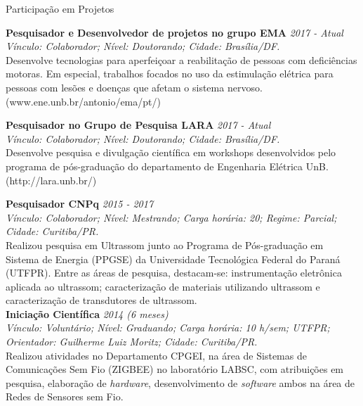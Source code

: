 \documentclass{resume} %
\begin{document}
\begin{rSection}{Participação em Projetos} 

{\bf Pesquisador e Desenvolvedor de projetos no grupo EMA} \hfill {\em 2017 - Atual}
\\\textit{Vínculo: Colaborador; Nível: Doutorando; Cidade: Brasília/DF.}
\\Desenvolve tecnologias para aperfeiçoar a reabilitação de pessoas com deficiências motoras. Em especial, trabalhos focados no uso da estimulação elétrica para pessoas com lesões e doenças que afetam o sistema nervoso.(www.ene.unb.br/antonio/ema/pt/)

{\bf Pesquisador no Grupo de Pesquisa LARA} \hfill {\em 2017 - Atual}
\\\textit{Vínculo: Colaborador; Nível: Doutorando; Cidade: Brasília/DF.}
\\Desenvolve pesquisa e divulgação científica em workshops desenvolvidos pelo programa de pós-graduação do departamento de Engenharia Elétrica UnB. (http://lara.unb.br/)

{\bf Pesquisador CNPq} \hfill {\em 2015 - 2017}
\\\textit{Vínculo: Colaborador; Nível: Mestrando; Carga horária: 20; Regime: Parcial; Cidade: Curitiba/PR.}
\\Realizou pesquisa em Ultrassom junto ao Programa de Pós-graduação em Sistema de Energia (PPGSE) da Universidade Tecnológica Federal do Paraná (UTFPR). Entre as áreas de pesquisa, destacam-se: instrumentação eletrônica aplicada ao ultrassom; caracterização de materiais utilizando ultrassom e caracterização de transdutores de ultrassom.\\

{\bf Iniciação Científica} \hfill {\em 2014 (6 meses)}
\\\textit{Vínculo: Voluntário; Nível: Graduando; Carga horária: 10 h/sem; UTFPR; Orientador: Guilherme Luiz Moritz; Cidade: Curitiba/PR.}
\\Realizou atividades no Departamento CPGEI, na área de Sistemas de Comunicações Sem Fio (ZIGBEE) no laboratório LABSC, com atribuições em pesquisa, elaboração de \textit{hardware}, desenvolvimento de \textit{software} ambos na área de Redes de Sensores sem Fio.






\end{rSection}
\end{document}
